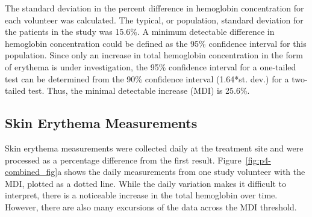 The standard deviation in the percent difference in hemoglobin concentration for each volunteer was calculated. The typical, or population, standard deviation for the patients in the study was 15.6\%.\cite{Knight1999} A minimum detectable difference in hemoglobin concentration could be defined as the 95\% confidence interval for this population.  Since only an increase in total hemoglobin concentration in the form of erythema is under investigation, the 95\% confidence interval for a one-tailed test can be determined from the 90\% confidence interval (1.64*st. dev.) for a two-tailed test. Thus, the minimal detectable increase (MDI) is 25.6\%.

\subsection{Skin Erythema Measurements}
Skin erythema measurements were collected daily at the treatment site and were processed as a percentage difference from the first result. Figure~\ref{fig:p4-combined_fig}a shows the daily measurements from one study volunteer with the MDI, plotted as a dotted line. While the daily variation makes it difficult to interpret, there is a noticeable increase in the total hemoglobin over time. However, there are also many excursions of the data across the MDI threshold.

